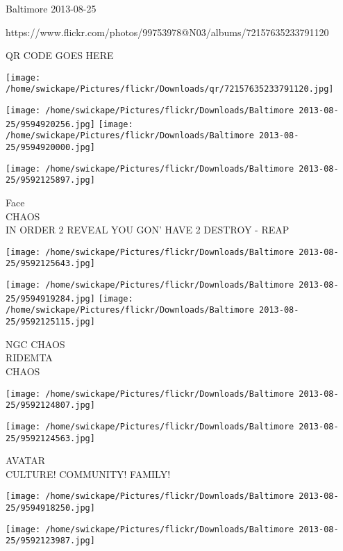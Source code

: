 \documentclass[10pt,letterpaper]{article}
\begin{document}
Baltimore 2013-08-25

https://www.flickr.com/photos/99753978@N03/albums/72157635233791120

QR CODE GOES HERE

\texttt{[image: /home/swickape/Pictures/flickr/Downloads/qr/72157635233791120.jpg]}
\pagebreak

\texttt{[image: /home/swickape/Pictures/flickr/Downloads/Baltimore 2013-08-25/9594920256.jpg]}
\texttt{[image: /home/swickape/Pictures/flickr/Downloads/Baltimore 2013-08-25/9594920000.jpg]}

\texttt{[image: /home/swickape/Pictures/flickr/Downloads/Baltimore 2013-08-25/9592125897.jpg]}

Face\\
CHAOS\\
IN ORDER 2 REVEAL YOU GON' HAVE 2 DESTROY {-} REAP\\
\pagebreak

\texttt{[image: /home/swickape/Pictures/flickr/Downloads/Baltimore 2013-08-25/9592125643.jpg]}

\vspace{0.25in}
\texttt{[image: /home/swickape/Pictures/flickr/Downloads/Baltimore 2013-08-25/9594919284.jpg]}
\texttt{[image: /home/swickape/Pictures/flickr/Downloads/Baltimore 2013-08-25/9592125115.jpg]}

NGC CHAOS\\
RIDEMTA\\
CHAOS\\
\pagebreak

\texttt{[image: /home/swickape/Pictures/flickr/Downloads/Baltimore 2013-08-25/9592124807.jpg]}

\vspace{0.25in}
\texttt{[image: /home/swickape/Pictures/flickr/Downloads/Baltimore 2013-08-25/9592124563.jpg]}

AVATAR\\
CULTURE! COMMUNITY! FAMILY!\\
\pagebreak

\texttt{[image: /home/swickape/Pictures/flickr/Downloads/Baltimore 2013-08-25/9594918250.jpg]}

\vspace{0.25in}
\texttt{[image: /home/swickape/Pictures/flickr/Downloads/Baltimore 2013-08-25/9592123987.jpg]}
\end{document}
